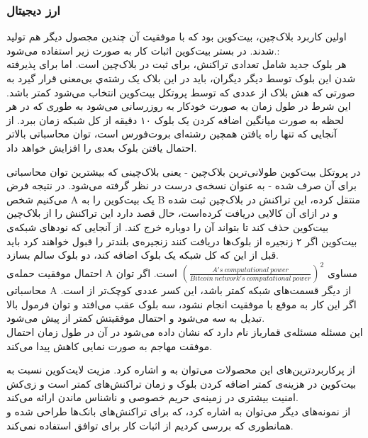 \subsubsection{ارز دیجیتال}
اولین کاربرد بلاک‌چین، بیت‌کوین بود که با موفقیت آن چندین مجصول دیگر هم تولید شدند. 
در بستر بیت‌کوین اثبات کار به صورت زیر استفاده می‌شود.:
\\
هر بلوک جدید شامل تعدادی تراکنش، برای ثبت در بلاک‌چین است. اما برای پذیرفته شدن این بلوک توسط دیگر دیگران، باید در این بلاک یک رشته‌ي بی‌معنی 
قرار گیرد به صورتی که هش بلاک از عددی که توسط پروتکل بیت‌کوین انتخاب می‌شود کمتر باشد. این شرط در طول زمان به صورت خودکار به روزرسانی می‌شود به طوری که در هر لحظه به صورت میانگین اضافه کردن یک بلوک ۱۰ دقیقه از کل شبکه زمان ببرد. از آنجایی که تنها راه یافتن همچین رشته‌ای بروت‌فورس
است، توان محاسباتی بالاتر احتمال یافتن بلوک بعدی را افزایش خواهد داد. 
\par
در پروتکل بیت‌کوین طولانی‌ترین بلاک‌چین - یعنی بلاک‌چینی که بیشترین توان محاسباتی برای آن صرف شده - به عنوان نسخه‌ی درست در نظر گرفته می‌شود. در نتیجه 
فرض می‌کنیم شخص A یک بیت‌کوین را به B منتقل کرده، این تراکنش در بلاک‌چین ثبت شده و در ازای آن کالایی دریافت کرده‌است، حال قصد دارد این تراکنش را از بلاک‌چین بیت‌کوین حذف کند تا بتواند آن را دوباره خرج کند. از آنجایی که نود‌های شبکه‌ی بیت‌کوین اگر ۲ زنجیره از بلوک‌ها دریافت کنند زنجیره‌ی بلند‌تر را قبول خواهند کرد باید قبل از این که کل شبکه یک بلوک  اضافه کند، دو بلوک سالم بسازد.
\\
احتمال موفقیت حمله‌ی A مساوی
$(\frac{A's\ computational\ power}{Bitcoin\ network's\ computational\ power}) ^ 2 $
است. اگر توان محاسباتی A از دیگر قسمت‌های شبکه کمتر باشد، این کسر عددی کوچک‌تر از 
است. اگر این کار به موقع با موفقیت انجام نشود، سه بلوک عقب می‌افتد و توان فرمول بالا تبدیل به سه می‌شود و احتمال موفقیتش کمتر از پیش می‌شود. 
\\
این مسئله مسئله‌ی قمارباز
نام دارد که نشان داده می‌شود در آن در طول زمان احتمال موفقت مهاجم به صورت نمایی کاهش پیدا می‌کند.
\par

از پرکاربرد‌ترین‌‌های این محصولات می‌توان به
و 
\cite{zerocash}
اشاره کرد. مزیت لایت‌کوین نسبت به بیت‌کوین در هزینه‌ی کمتر اضافه کردن بلوک و زمان تراکنش‌های کمتر است و زی‌کش امنیت بیشتری در زمینه‌ی حریم خصوصی و ناشناس ماندن ارائه می‌کند. 
\\ 
از نمونه‌های دیگر می‌توان به 
اشاره کرد، که برای تراکنش‌های بانک‌ها طراحی شده و همانطوری که بررسی کردیم از اثبات کار برای توافق استفاده نمی‌کند. 

